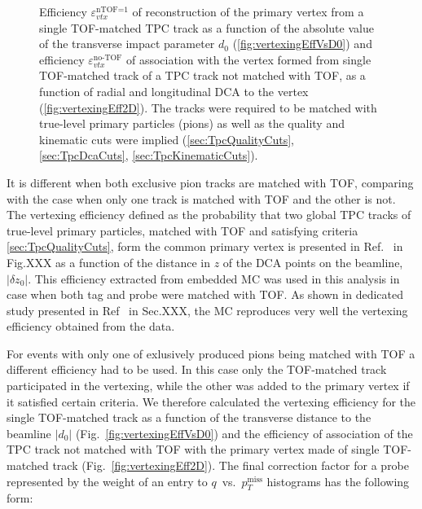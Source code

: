 \begin{figure}[b!]
{\begin{subfigure}[b]{\linewidth}
  \end{subfigure}
}%
\caption[Efficiencies for reconstruction of the vertex with single TOF-matched TPC track and association with this vertex of TOF-unmatched track.]%
    {Efficiency $\varepsilon_{vtx}^{\text{nTOF=1}}$ of reconstruction of the primary vertex from a single TOF-matched TPC track as a function of the absolute value of the transverse impact parameter $d_{0}$ (\ref{fig:vertexingEffVsD0}) and efficiency $\varepsilon_{vtx}^{\text{no-TOF}}$ of association with the vertex formed from single TOF-matched track of a TPC track not matched with TOF, as a function of radial and longitudinal DCA to the vertex (\ref{fig:vertexingEff2D}). The tracks were required to be matched with true-level primary particles (pions) as well as the quality and kinematic cuts were implied (\ref{sec:TpcQualityCuts}, \ref{sec:TpcDcaCuts}, \ref{sec:TpcKinematicCuts}).}\label{fig:vertexingEffTagAndProbe}%
\end{figure}
%
%
It is different when both exclusive pion tracks are matched with TOF, comparing with the case when only one track is matched with TOF and the other is not. The vertexing efficiency defined as the probability that two global TPC tracks of true-level primary particles, matched with TOF and satisfying criteria \ref{sec:TpcQualityCuts}, form the common primary vertex is presented in Ref.~\cite{AnalysisNoteRafal} in Fig.XXX as a function of the distance in $z$ of the DCA points on the beamline, $|\delta z_{0}|$. This efficiency extracted from embedded MC was used in this analysis in case when both tag and probe were matched with TOF. As shown in dedicated study presented in Ref~\cite{AnalysisNoteRafal} in Sec.XXX, the MC reproduces very well the vertexing efficiency obtained from the data.

For events with only one of exlusively produced pions being matched with TOF a different efficiency had to be used. In this case only the TOF-matched track participated in the vertexing, while the other was added to the primary vertex if it satisfied certain criteria. We therefore calculated the vertexing efficiency for the single TOF-matched track as a function of the transverse distance to the beamline $|d_{0}|$ (Fig.~\ref{fig:vertexingEffVsD0}) and the efficiency of association of the TPC track not matched with TOF with the primary vertex made of single TOF-matched track (Fig.~\ref{fig:vertexingEff2D}). The final correction factor for a probe represented by the weight of an entry to $q$~vs.~$p_{T}^{\text{miss}}$ histograms has the following form:

